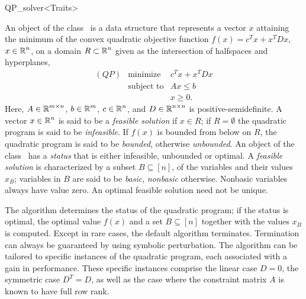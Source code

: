 
\begin{ccRefClass}{QP_solver<Traits>}

\ccDefinition
An object of the class \ccRefName\ is a data structure that
represents a vector $x$ attaining the minimum of the convex quadratic objective
function $f(x)=c^{T}x+x^{T}Dx$, $x \in \mbox{$\mathbb R$}^{n}$, on a domain $R \subset \mbox{$\mathbb R$}^{n}$
given as the intersection of halfspaces and hyperplanes,
\begin{eqnarray*}
(QP)&\mbox{minimize} & c^{T}x+x^{T}Dx \\
&\mbox{subject to}   & Ax \leq b \\
&& x \geq 0.
\end{eqnarray*}
Here, $A \in \mbox{$\mathbb R$}^{m \times n}$, $b \in \mbox{$\mathbb R$}^{m}$, $c \in \mbox{$\mathbb R$}^{n}$, and
$D \in \mbox{$\mathbb R$}^{n \times n}$ is positive-semidefinite.
A vector $x \in \mbox{$\mathbb R$}^{n}$ is said to be a \emph{feasible solution}
if $x \in R$; if $R=\emptyset$ the quadratic program is said to be
\emph{infeasible}. If $f(x)$ is bounded from
below on $R$, the quadratic program is said to be \emph{bounded}, otherwise
\emph{unbounded}. An object of the class \ccRefName\ has a \emph{status} that
is either infeasible, unbounded or optimal.  
A \emph{feasible solution} is characterized by a
subset $B\subseteq\left[n\right]$, of the variables
and their values $x_{B}$;
variables in $B$ are said to be \emph{basic}, \emph{nonbasic} otherwise. 
Nonbasic variables always have value zero. An optimal feasible solution
need not be unique.

The algorithm determines the status of the quadratic program; if the status is
optimal, the optimal value $f(x)$ and a set $B \subseteq \left[n\right]$
together with the values $x_{B}$ is computed. Except in rare
cases, the default algorithm terminates. Termination can always be guaranteed
by using symbolic perturbation. The algorithm can be tailored to specific
instances of the quadratic program, each associated with a gain in performance.
These specific
instances comprise the linear case $D=0$, the symmetric case $D^{T}=D$, as
well as the case where the constraint matrix $A$ is known to have full row rank.   


\end{ccRefClass}
